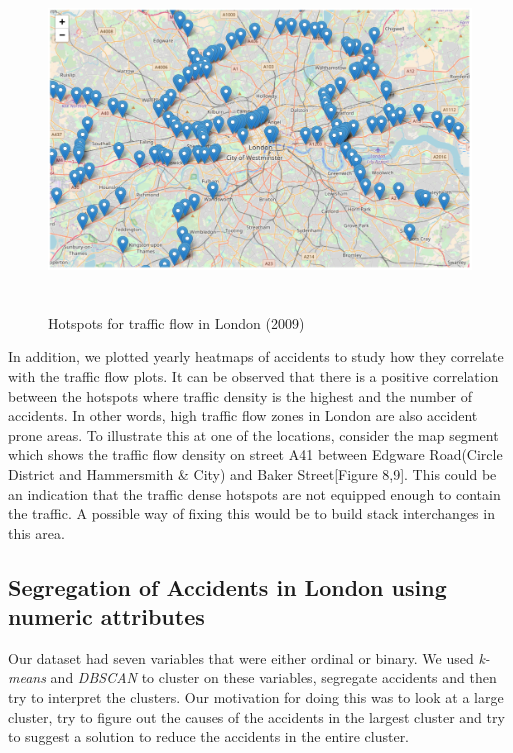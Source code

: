 \documentclass[a4paper, 11pt]{article}
\begin{document}
\begin{figure}[H]
    \begin{center}
      \includegraphics[height=9cm, width=20cm, keepaspectratio]{2009-hotspots.png}
      \caption{Hotspots for traffic flow in London (2009)}
    \end{center}
\end{figure}

In addition, we plotted yearly heatmaps of accidents to study how they correlate with the traffic flow plots. It can be observed that there is a positive correlation between the hotspots where traffic density is the highest and the number of accidents. In other words, high traffic flow zones in London are also accident prone areas. To illustrate this at one of the locations, consider the map segment which shows the traffic flow density on street A41 between Edgware Road(Circle District and Hammersmith \& City) and Baker Street[Figure 8,9]. This could be an indication that the traffic dense hotspots are not equipped enough to contain the traffic. A possible way of fixing this would be to build stack interchanges in this area.

\subsection{Segregation of Accidents in London using numeric attributes}

Our dataset had seven variables that were either ordinal or binary. We used \textit{k-means} and \textit{DBSCAN} to cluster on these variables, segregate accidents and then try to interpret the clusters. Our motivation for doing this was to look at a large cluster, try to figure out the causes of the accidents in the largest cluster and try to suggest a solution to reduce the accidents in the entire cluster. \\
\end{document}
